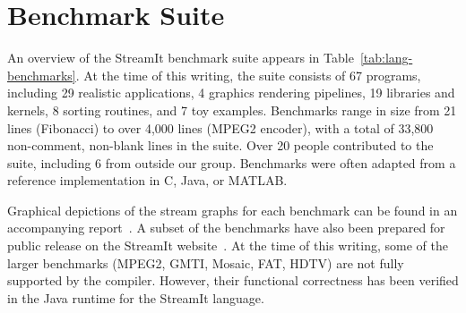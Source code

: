 \section{Benchmark Suite}


An overview of the StreamIt benchmark suite appears in
Table~\ref{tab:lang-benchmarks}.  At the time of this writing, the
suite consists of 67 programs, including 29 realistic applications, 4
graphics rendering pipelines, 19 libraries and kernels, 8 sorting
routines, and 7 toy examples.  Benchmarks range in size from 21 lines
(Fibonacci) to over 4,000 lines (MPEG2 encoder), with a total of
33,800 non-comment, non-blank lines in the suite\footnotemark[1].
Over 20 people contributed to the suite, including 6 from outside our
group.
Benchmarks were often adapted from a reference implementation in C,
Java, or MATLAB.

Graphical depictions of the stream graphs for each benchmark can be
found in an accompanying report~\cite{thies-thesis}.
A subset of the benchmarks have also been prepared for public release
on the StreamIt website~\cite{streamitweb}.  At the time of this
writing, some of the larger benchmarks (MPEG2, GMTI, Mosaic, FAT,
HDTV) are not fully supported by the compiler.  However, their
functional correctness has been verified in the Java runtime for the
StreamIt language.

